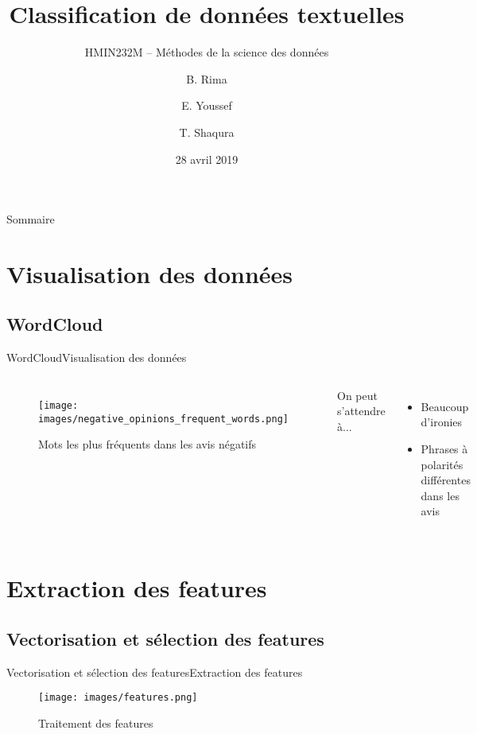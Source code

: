 \documentclass[usenames,dvipsnames]{beamer}
\title{Classification de données textuelles}
\subtitle{HMIN232M -- Méthodes de la science des données}
\author{B. Rima \and E. Youssef \and T. Shaqura}
\institute[UM]{M1 Informatique AIGLE}
\date{28 avril 2019}
\begin{document}
\begin{frame}
\titlepage
\end{frame}
\begin{frame}{Sommaire}
\tableofcontents
\end{frame}
\section{Visualisation des données}
\subsection{WordCloud}
\begin{frame}{WordCloud}{Visualisation des données}
\begin{columns}
\begin{figure}
    \centering
    \texttt{[image: images/negative\_opinions\_frequent\_words.png]}
    \caption{Mots les plus fréquents dans les avis négatifs}
    \label{fig:most_freq_neg}
\end{figure}
On peut s'attendre à...
\begin{itemize}
    \item Beaucoup d'ironies
    \item Phrases à polarités différentes dans les avis
\end{itemize}
\end{columns}
\end{frame}

\section{Extraction des features}
\subsection{Vectorisation et sélection des features}
\begin{frame}{Vectorisation et sélection des features}{Extraction des features}
\begin{figure}
    \centering
    \texttt{[image: images/features.png]}
    \caption{Traitement des features}
    \label{fig:features}
\end{figure}
\end{frame}
\end{document}
